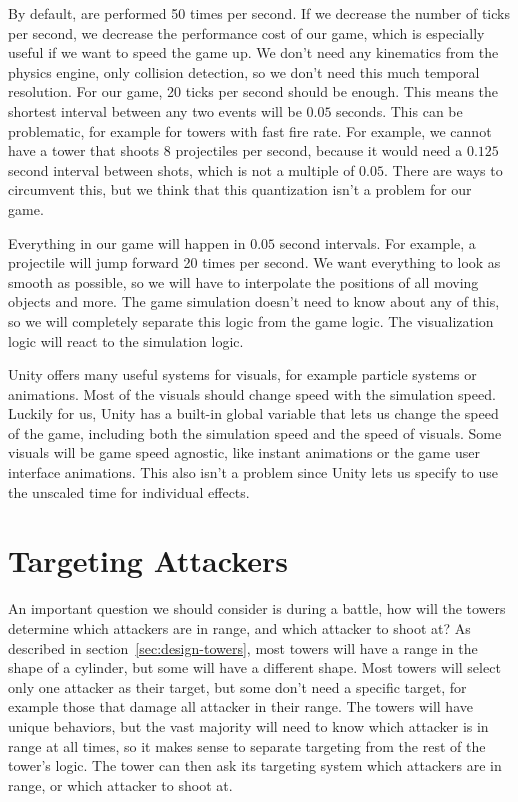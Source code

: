 By default,  are performed 50 times per second.
If we decrease the number of ticks per second, we decrease the performance cost of our game, which is especially useful if we want to speed the game up.
We don't need any kinematics from the physics engine, only collision detection, so we don't need this much temporal resolution.
For our game, 20 ticks per second should be enough.
This means the shortest interval between any two events will be $0.05$ seconds.
This can be problematic, for example for towers with fast fire rate.
For example, we cannot have a tower that shoots 8 projectiles per second, because it would need a $0.125$ second interval between shots, which is not a multiple of $0.05$.
There are ways to circumvent this, but we think that this quantization isn't a problem for our game.

Everything in our game will happen in $0.05$ second intervals.
For example, a projectile will jump forward 20 times per second.
We want everything to look as smooth as possible, so we will have to interpolate the positions of all moving objects and more.
The game simulation doesn't need to know about any of this, so we will completely separate this logic from the game logic.
The visualization logic will react to the simulation logic.

Unity offers many useful systems for visuals, for example particle systems or animations.
Most of the visuals should change speed with the simulation speed.
Luckily for us, Unity has a built-in global variable that lets us change the speed of the game, including both the simulation speed and the speed of visuals.
Some visuals will be game speed agnostic, like instant animations or the game user interface animations.
This also isn't a problem since Unity lets us specify to use the unscaled time for individual effects.

\section{Targeting Attackers}

An important question we should consider is during a battle, how will the towers determine which attackers are in range, and which attacker to shoot at?
As described in section~\ref{sec:design-towers}, most towers will have a range in the shape of a cylinder, but some will have a different shape.
Most towers will select only one attacker as their target, but some don't need a specific target, for example those that damage all attacker in their range.
The towers will have unique behaviors, but the vast majority will need to know which attacker is in range at all times, so it makes sense to separate targeting from the rest of the tower's logic.
The tower can then ask its targeting system which attackers are in range, or which attacker to shoot at.

